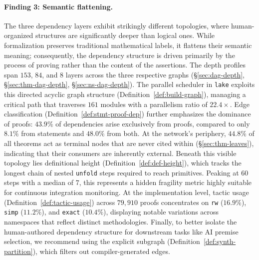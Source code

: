 \paragraph{Finding 3: Semantic flattening.}
The three dependency layers exhibit strikingly different topologies, where human-organized structures are significantly deeper than logical ones. While formalization preserves traditional mathematical labels, it flattens their semantic meaning; consequently, the dependency structure is driven primarily by the process of proving rather than the content of the assertions. The depth profiles span $153$, $84$, and $8$ layers across the three respective graphs (\S\ref{sec:dag-depth}, \S\ref{sec:thm-dag-depth}, \S\ref{sec:ns-dag-depth}). The parallel scheduler in \texttt{lake} exploits this directed acyclic graph structure (Definition~\ref{def:build-graph}), managing a critical path that traverses $161$ modules with a parallelism ratio of $22.4\times$. Edge classification (Definition~\ref{def:stmt-proof-dep}) further emphasizes the dominance of proofs: $43.9\%$ of dependencies arise exclusively from proofs, compared to only $8.1\%$ from statements and $48.0\%$ from both. At the network's periphery, $44.8\%$ of all theorems act as terminal nodes that are never cited within  (\S\ref{sec:thm-leaves}), indicating that their consumers are inherently external. Beneath this visible topology lies definitional height (Definition~\ref{def:def-height}), which tracks the longest chain of nested \texttt{unfold} steps required to reach primitives. Peaking at $60$ steps with a median of $7$, this represents a hidden fragility metric highly suitable for continuous integration monitoring. At the implementation level, tactic usage (Definition~\ref{def:tactic-usage}) across $79{,}910$ proofs concentrates on \texttt{rw} ($16.9\%$), \texttt{simp} ($11.2\%$), and \texttt{exact} ($10.4\%$), displaying notable variations across namespaces that reflect distinct methodologies. Finally, to better isolate the human-authored dependency structure for downstream tasks like AI premise selection, we recommend using the explicit subgraph (Definition~\ref{def:synth-partition}), which filters out compiler-generated edges.